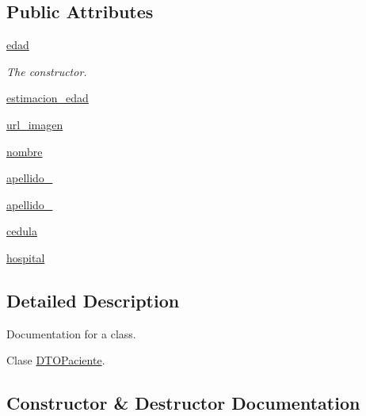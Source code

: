 \subsection*{Public Attributes}
\begin{DoxyCompactItemize}
\item 
\mbox{\hyperlink{class_d_t_o_paciente_1_1_d_t_o_paciente_a6c0a16c04f3f4f532dc3470daa7250d3}{edad}}
\begin{DoxyCompactList}\small\item\em The constructor. \end{DoxyCompactList}\item 
\mbox{\hyperlink{class_d_t_o_paciente_1_1_d_t_o_paciente_a282cdef74b37d69d0ed009291cdf9225}{estimacion\+\_\+edad}}
\item 
\mbox{\hyperlink{class_d_t_o_paciente_1_1_d_t_o_paciente_a6967d3ef12a5f519b23d4dc11791b0da}{url\+\_\+imagen}}
\item 
\mbox{\hyperlink{class_d_t_o_paciente_1_1_d_t_o_paciente_a3861795f8106322724f29363fdc9b906}{nombre}}
\item 
\mbox{\hyperlink{class_d_t_o_paciente_1_1_d_t_o_paciente_af7ca31ca9bedc6ba5d26a16417956946}{apellido\+\_}}
\item 
\mbox{\hyperlink{class_d_t_o_paciente_1_1_d_t_o_paciente_a46fe18fb40785e8b0632447286e54762}{apellido\+\_}}
\item 
\mbox{\hyperlink{class_d_t_o_paciente_1_1_d_t_o_paciente_a1801177d437a9d92e8ed39f69a336b8b}{cedula}}
\item 
\mbox{\hyperlink{class_d_t_o_paciente_1_1_d_t_o_paciente_af7d96afe885e6aae044cfbbac8c5ac52}{hospital}}
\end{DoxyCompactItemize}


\subsection{Detailed Description}
Documentation for a class. 

Clase \mbox{\hyperlink{class_d_t_o_paciente_1_1_d_t_o_paciente}{D\+T\+O\+Paciente}}. 

\subsection{Constructor \& Destructor Documentation}
\mbox{\label{class_d_t_o_paciente_1_1_d_t_o_paciente_ae51dc8aed25bb089d13923edce9ece56}} 
